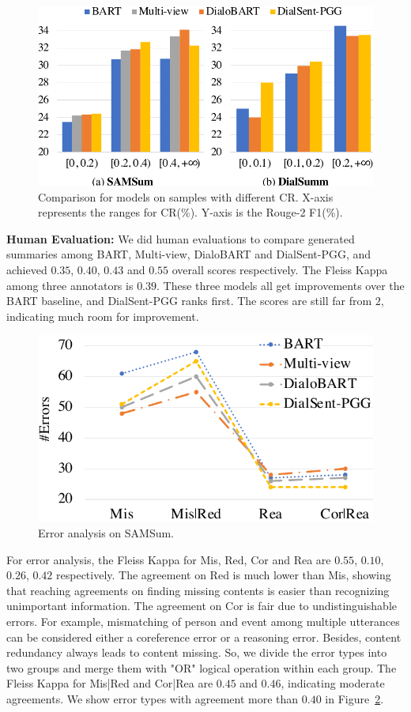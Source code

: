 \begin{figure}
	\centering
	\includegraphics[scale=0.56]{compressionratio.pdf}
	\caption{Comparison for models on samples with different CR. X-axis represents the ranges for CR(\%). Y-axis is the Rouge-2 F1(\%). }
	\label{fig:cr}
\end{figure}

\textbf{Human Evaluation:} We did human evaluations to compare generated summaries among BART, Multi-view, DialoBART and DialSent-PGG, and achieved $0.35$, $0.40$, $0.43$ and $0.55$ overall scores respectively. The Fleiss Kappa among three annotators is $0.39$. These three models all get improvements over the BART baseline, and DialSent-PGG ranks first. The scores are still far from $2$, indicating much room for improvement. 

\begin{figure}
	\centering
	\includegraphics[scale=0.55]{humaneval.pdf}
	\caption{Error analysis on SAMSum. }
	\label{fig:humaneval}
\end{figure}
For error analysis, the Fleiss Kappa for Mis, Red, Cor and Rea are $0.55$, $0.10$, $0.26$, $0.42$ respectively. The agreement on Red is much lower than Mis, showing that reaching agreements on finding missing contents is easier than recognizing unimportant information. The agreement on Cor is fair due to undistinguishable errors. For example, mismatching of person and event among multiple utterances can be considered either a coreference error or a reasoning error. Besides, content redundancy always leads to content missing. So, we divide the error types into two groups and merge them with "OR" logical operation within each group. The Fleiss Kappa for Mis|Red and Cor|Rea are $0.45$ and $0.46$, indicating moderate agreements. We show error types with agreement more than $0.40$ in Figure~\ref{fig:humaneval}. 

